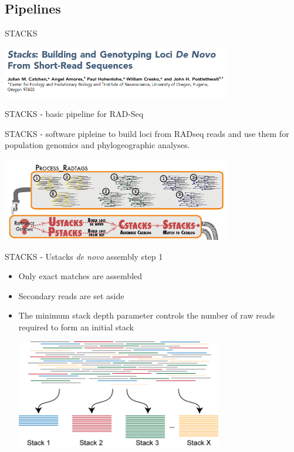 \documentclass[presentation]{beamer}
\begin{document}
\subsection{Pipelines}
\label{sec-4-1}
\begin{frame}[label=sec-4-1-1]{STACKS \citep{Puritz2014}}
\begin{center}

\includegraphics[width=10cm]{Stacks.png}

\end{center}
\end{frame}
\begin{frame}[label=sec-4-1-2]{STACKS - basic pipeline for RAD-Seq}
\begin{center}
STACKS - software pipleine to build loci from RADseq reads and use
them for population genomics and phylogeographic analyses.

\includegraphics[width=10cm]{Catchen2013Fig1a.png}

\tiny{\citep{Catchen2013a}}
\end{center}
\end{frame}


\begin{frame}[label=sec-4-1-3]{STACKS - Ustacks \emph{de novo} assembly step 1}
\begin{itemize}
\item Only exact matches are assembled
\item Secondary reads are set aside
\item The minimum stack depth parameter controls the number of raw reads  required to form an initial stack
\begin{center}
\includegraphics[width=9cm]{Catchen2013DeNovoStep1.png}

\tiny{\citep{Catchen2013a}}
\end{center}
\end{itemize}
\end{frame}
\end{document}
